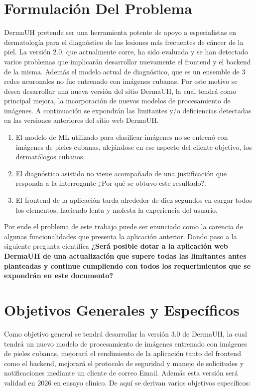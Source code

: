 \section{Formulaci\'on Del Problema}
DermaUH pretende ser una herramienta potente de apoyo a especialistas en dermatolog\'ia para
el diagn\'ostico de las lesiones m\'as frecuentes de c\'ancer de la piel. La versi\'on 2.0, que
actualmente corre, ha sido evaluada y se han detectado varios problemas que implicar\'an desarrollar
nuevamente el frontend y el backend de la misma. Adem\'as el modelo actual de diagn\'ostico, que 
es un ensemble de 3 redes neuronales no fue entrenado con im\'agenes cubanas.
Por este motivo se desea desarrollar una nueva versi\'on del sitio DermaUH, la cual tendr\'a como 
principal mejora, la incorporaci\'on de nuevos modelos de procesamiento de im\'agenes. A continuaci\'on
se expondr\'an las limitantes y/o deficiencias detectadas en las versiones anteriores del sitio 
web DermaUH.

\begin{enumerate}
    \item El modelo de ML utilizado para clasificar im\'agenes no se entren\'o con im\'agenes de pieles cubanas, alej\'andose en ese aspecto del cliente objetivo, los dermat\'ologos cubanos.
    \item El diagn\'ostico asistido no viene acompa\~nado de una justificaci\'on que responda a la interrogante ¿Por qué se obtuvo este resultado?.
    \item El frontend de la aplicaci\'on tarda alrededor de diez segundos en cargar todos los elementos, haciendo lenta y molesta la experiencia del usuario.
\end{enumerate}

Por ende el problema de este trabajo puede ser enunciado como la carencia de algunas funcionalidades que 
presenta la aplicación anterior. Dando paso a la siguiente pregunta científica \textbf{¿Ser\'a posible
dotar a la aplicaci\'on web DermaUH de una actualizaci\'on que supere todas las limitantes
antes planteadas y continue cumpliendo con todos los requerimientos que se expondr\'an en este documento?}

\section{Objetivos Generales y Espec\'ificos}
Como objetivo general se tendr\'a desarrollar la versi\'on 3.0 de DermaUH, la cual tendr\'a un nuevo
modelo de procesamiento de im\'agenes entrenado con im\'agenes de pieles cubanas, mejorar\'a el rendimiento
de la aplicaci\'on tanto del frontend como el backend, mejorar\'a el protocolo de seguridad y manejo de solicitudes
y notificaciones mediante un cliente de correo Email. Adem\'as esta versi\'on ser\'a validad en 2026
en ensayo cl\'inico. De aqu\'i se derivan varios objetivos espec\'ificos:

